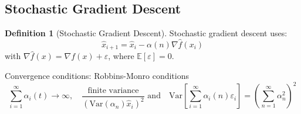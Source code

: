 \documentclass[12pt,a4paper]{article}
\theoremstyle{definition}
\newtheorem{definition}{Definition}[section]
\begin{document}
\subsection{Stochastic Gradient Descent}

\begin{definition}[Stochastic Gradient Descent]
Stochastic gradient descent uses:
\[
\hat{x}_{i+1} = \hat{x}_i - \alpha(n) \nabla \hat{f}(x_i)
\]
with $\nabla \hat{f}(x) = \nabla f(x) + \varepsilon$, where $\mathbb{E}[\varepsilon] = 0$.

Convergence conditions: Robbins-Monro conditions
\[
\sum_{i=1}^{\infty} \alpha_i(t) \to \infty, \quad \frac{\text{finite variance}}{(\text{Var}(\alpha_n)\hat{x}_i)^2} \text{ and} \quad \text{Var}\left[\sum_{i=1}^{\infty} \alpha_i(n)\varepsilon_i\right] = \left(\sum_{n=1}^{\infty} \alpha_n^2\right)^2
\]
\end{definition}
\end{document}
